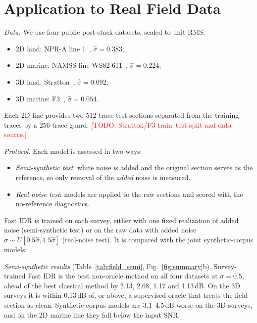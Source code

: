 \documentclass[journal]{IEEEtran}
\newcommand{\todo}[1]{\textcolor{red}{[TODO: #1]}}
\begin{document}


\section{Application to Real Field Data}\label{sec:field}
\emph{Data.} We use four public post-stack datasets, scaled to unit RMS:
\begin{itemize}
\item 2D land: NPR-A line 1~\cite{miller2000npra}, $\hat\sigma=0.383$;
\item 2D marine: NAMSS line WS82-611~\cite{namss}, $\hat\sigma=0.224$;
\item 3D land: Stratton~\cite{hardage1994stratton}, $\hat\sigma=0.092$;
\item 3D marine: F3~\cite{alaudah2019f3}, $\hat\sigma=0.054$.
\end{itemize}
Each 2D line provides two 512-trace test sections separated from the training traces by a 256-trace guard. \todo{Stratton/F3 train--test split and data source.}

\emph{Protocol.} Each model is assessed in two ways:
\begin{itemize}
\item \emph{Semi-synthetic test}: white noise is added and the original section serves as the reference, so only removal of the \emph{added} noise is measured.
\item \emph{Real-noise test}: models are applied to the raw sections and scored with the no-reference diagnostics.
\end{itemize}
Fast IDR is trained on each survey, either with one fixed realization of added noise (semi-synthetic test) or on the raw data with added noise $\sigma\sim U[0.5\hat\sigma,1.5\hat\sigma]$ (real-noise test). It is compared with the joint synthetic-corpus models.

\emph{Semi-synthetic results} (Table~\ref{tab:field_semi}, Fig.~\ref{fig:summary}b). Survey-trained Fast IDR is the best non-oracle method on all four datasets at $\sigma=0.5$, ahead of the best classical method by 2.13, 2.68, 1.17 and 1.13\,dB. On the 3D surveys it is within 0.13\,dB of, or above, a supervised oracle that treats the field section as clean. Synthetic-corpus models are 3.1--4.5\,dB worse on the 3D surveys, and on the 2D marine line they fall below the input SNR.


\end{document}
